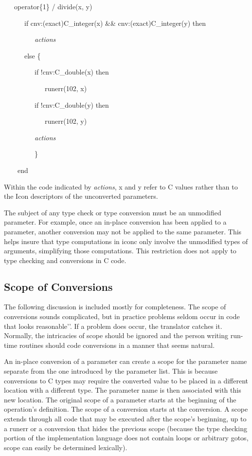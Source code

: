 {\ttfamily\mdseries
\ \ \ operator\{1\} / divide(x, y)}

{\ttfamily\mdseries
\ \ \ \ \ \ if cnv:(exact)C\_integer(x) \&\& cnv:(exact)C\_integer(y) then}

{\ttfamily\mdseries
\ \ \ \ \ \ \ \ \ \textit{actions}}

{\ttfamily\mdseries
\ \ \ \ \ \ else \{}

{\ttfamily\mdseries
\ \ \ \ \ \ \ \ \ if !cnv:C\_double(x) then}

{\ttfamily\mdseries
\ \ \ \ \ \ \ \ \ \ \ \ runerr(102, x)}

{\ttfamily\mdseries
\ \ \ \ \ \ \ \ \ if !cnv:C\_double(y) then}

{\ttfamily\mdseries
\ \ \ \ \ \ \ \ \ \ \ \ runerr(102, y)}

{\ttfamily\mdseries
\ \ \ \ \ \ \ \ \ \textit{actions}}

{\ttfamily\mdseries
\ \ \ \ \ \ \ \ \ \}}

{\ttfamily\mdseries
\ \ \ \ end}

Within the code indicated by \textit{actions}, x and y refer to C
values rather than to the Icon descriptors of the unconverted
parameters.

The subject of any type check or type conversion must be an unmodified
parameter. For example, once an in-place conversion has been applied
to a parameter, another conversion may not be applied to the same
parameter. This helps insure that type computations in iconc only
involve the unmodified types of arguments, simplifying those
computations.  This restriction does not apply to type checking and
conversions in C code.

\subsection{Scope of Conversions}

The following discussion is included mostly for completeness. The
scope of conversions sounds complicated, but in practice problems
seldom occur in code that {\textasciigrave}{\textasciigrave}looks
reasonable'{}'. If a problem does occur, the translator catches
it. Normally, the intricacies of scope should be ignored and the
person writing run-time routines should code conversions in a manner
that seems natural.

An {\textquotedbl}in-place{\textquotedbl} conversion of a parameter
can create a scope for the parameter name separate from the one
introduced by the parameter list. This is because conversions to C
types may require the converted value to be placed in a different
location with a different type. The parameter name is then associated
with this new location. The original scope of a parameter starts at
the beginning of the operation's definition. The scope of a conversion
starts at the conversion. A scope extends through all code that may be
executed after the scope's beginning, up to a runerr or a conversion
that hides the previous scope (because the type checking portion of
the implementation language does not contain loops or arbitrary gotos,
scope can easily be determined lexically).


